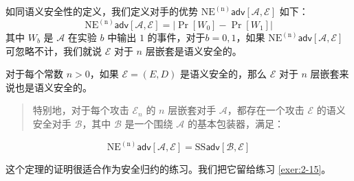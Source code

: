 如同语义安全性的定义，我们定义对手的优势 $\mathrm{NE^{(n)}}\mathsf{adv}[\mathcal{A},\mathcal{E}]$ 如下：
\[
\mathrm{NE^{(n)}}\mathsf{adv}[\mathcal{A},\mathcal{E}]=\big\vert\Pr[W_0]-\Pr[W_1]\big\vert
\]
其中 $W_b$ 是 $\mathcal{A}$ 在实验 $b$ 中输出 $1$ 的事件，对于$b=0,1$，如果 $\mathrm{NE^{(n)}}\mathsf{adv}[\mathcal{A},\mathcal{E}]$ 可忽略不计，我们就说 $\mathcal{E}$ 对于 $n$ 层嵌套是语义安全的。

\begin{theorem}
对于每个常数 $n>0$，如果 $\mathcal{E}=(E,D)$ 是语义安全的，那么 $\mathcal{E}$ 对于 $n$ 层嵌套来说也是语义安全的。
\begin{quote}
特别地，对于每个攻击 $\mathcal{E}_n$ 的 $n$ 层嵌套对手 $\mathcal{A}$，都存在一个攻击 $\mathcal{E}$ 的语义安全对手 $\mathcal{B}$，其中 $\mathcal{B}$ 是一个围绕 $\mathcal{A}$ 的基本包装器，满足：
\end{quote}
\[
\mathrm{NE^{(n)}}\mathsf{adv}[\mathcal{A},\mathcal{E}]=\mathrm{SS}\mathsf{adv}[\mathcal{B},\mathcal{E}]
\]
\end{theorem}

\noindent
这个定理的证明很适合作为安全归约的练习。我们把它留给练习 \ref{exer:2-15}。